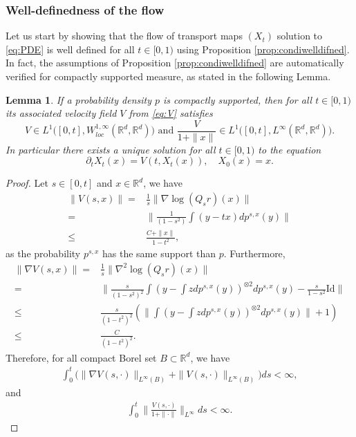 \documentclass{article}
\newtheorem{lemma}{Lemma}
\begin{document}
\subsubsection{Well-definedness of the flow}
Let us start by showing that the flow of transport maps $(X_t)$ solution to \eqref{eq:PDE} is well defined for all $t\in [0,1)$ using Proposition \ref{prop:condiwelldifned}. In fact, the assumptions of Proposition \ref{prop:condiwelldifned} are automatically verified for compactly supported measure, as stated in the following Lemma.
\begin{lemma}\label{lemma:le5}
    If a probability density $p$ is compactly supported, then for all $t\in [0,1)$ its associated velocity field $V$ from \eqref{eq:V} satisfies
$$V\in L^1\Big([0,t],W^{1,\infty}_{loc}(\mathbb{R}^d,\mathbb{R}^d)\Big)\text{ and } \frac{V}{1+\|x\|}\in L^1\Big([0,t],L^{\infty}(\mathbb{R}^d,\mathbb{R}^d)\Big).$$
In particular there exists a unique solution for all $t\in [0,1)$ to the equation
    $$\partial_t X_t(x) =V(t,X_t(x)), \quad X_0(x)=x.$$
\end{lemma}
\begin{proof}
    Let $s\in [0,t]$ and $x\in \mathbb{R}^d$, we have
\begin{align*}
    \|V(s,x)\| = &\frac{1}{s}\|\nabla \log(Q_s r)(x)\|\\
     =&\|\frac{1}{(1-s^2)}\int (y-tx) dp^{s,x}(y)\|\\
     \leq &\frac{C+\|x\|}{1-t^2},
\end{align*}
as the probability $p^{s,x}$ has the same support than $p$. Furthermore,
\begin{align*}
           \|\nabla V(s,x)\| = &\frac{1}{s}\|\nabla^2 \log(Q_s r)(x)\|\\
     =&\|\frac{s}{(1-s^2)^2}\int \left(y-\int z dp^{s,x}(y)\right)^{\otimes 2}dp^{s,x}(y)-\frac{s}{1-s^2}\text{Id}\|\\
     \leq & \frac{s}{(1-t^2)^2}\left( \|\int \left(y-\int z dp^{s,x}(y)\right)^{\otimes 2} dp^{s,x}(y)\|+1\right)\\
     \leq &\frac{C}{(1-t^2)^2}.
\end{align*}
Therefore, for all compact Borel set $B\subset \mathbb{R}^d$, we have 
\begin{align*}
    \int_0^t \Big(\|\nabla V(s,\cdot)\|_{L^\infty(B)}+\| V(s,\cdot)\|_{L^\infty(B)}  \Big)ds <\infty,
\end{align*}
and
\begin{align*}
    \int_0^t \| \frac{V(s,\cdot)}{1+\|\cdot\|}\|_{L^\infty}ds <\infty.
\end{align*}
\end{proof}
\end{document}
